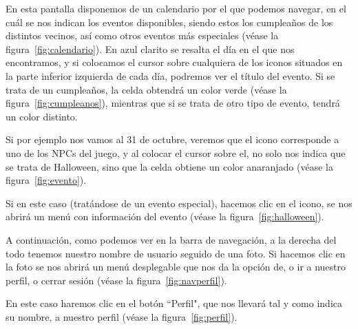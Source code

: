 
En esta pantalla disponemos de un calendario por el que podemos navegar, en el cuál se nos indican los eventos disponibles, siendo estos los cumpleaños de los distintos vecinos, así como otros eventos más especiales {(v\'ease la figura~\ref{fig:calendario})}. En azul clarito se resalta el día en el que nos encontramos, y si colocamos el cursor sobre cualquiera de los iconos situados en la parte inferior izquierda de cada día, podremos ver el título del evento. Si se trata de un cumpleaños, la celda obtendrá un color verde {(v\'ease la figura~\ref{fig:cumpleanos})}, mientras que si se trata de otro tipo de evento, tendrá un color distinto.\\


\clearpage

Si por ejemplo nos vamos al 31 de octubre, veremos que el icono corresponde a uno de los NPCs del juego, y al colocar el cursor sobre el, no solo nos indica que se trata de Halloween, sino que la celda obtiene un color anaranjado {(v\'ease la figura~\ref{fig:evento})}.\\


 Si en este caso (tratándose de un evento especial), hacemos clic en el icono, se nos abrirá un menú con información del evento {(v\'ease la figura~\ref{fig:halloween})}.\\


\clearpage

A continuación, como podemos ver en la barra de navegación, a la derecha del todo tenemos nuestro nombre de usuario seguido de una foto. Si hacemos clic en la foto se nos abrirá un menú desplegable que nos da la opción de, o ir a nuestro perfil, o cerrar sesión {(v\'ease la figura~\ref{fig:navperfil})}.\\


En este caso haremos clic en el botón ``Perfil", que nos llevará tal y como indica su nombre, a nuestro perfil {(v\'ease la figura~\ref{fig:perfil})}.\\

